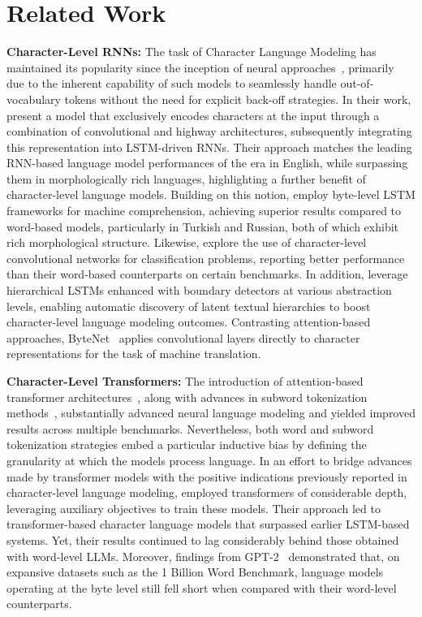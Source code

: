 \section{Related Work}
\label{section:related_work}

\textbf{Character-Level RNNs:} The task of Character Language Modeling has maintained its popularity since the inception of neural approaches~\citep{sutskever2011generating,mikolov2012subword,graves2013generating}, primarily due to the inherent capability of such models to seamlessly handle out-of-vocabulary tokens without the need for explicit back-off strategies. In their work, \cite{kim2016character} present a model that exclusively encodes characters at the input through a combination of convolutional and highway architectures, subsequently integrating this representation into LSTM-driven RNNs. Their approach matches the leading RNN-based language model performances of the era in English, while surpassing them in morphologically rich languages, highlighting a further benefit of character-level language models. Building on this notion, \cite{kenter2018byte} employ byte-level LSTM frameworks for machine comprehension, achieving superior results compared to word-based models, particularly in Turkish and Russian, both of which exhibit rich morphological structure. Likewise, \cite{zhang2015character} explore the use of character-level convolutional networks for classification problems, reporting better performance than their word-based counterparts on certain benchmarks. In addition, \citet{chung2019hierarchical} leverage hierarchical LSTMs enhanced with boundary detectors at various abstraction levels, enabling automatic discovery of latent textual hierarchies to boost character-level language modeling outcomes. Contrasting attention-based approaches, ByteNet~\cite{kalchbrenner2016neural} applies convolutional layers directly to character representations for the task of machine translation.

\textbf{Character-Level Transformers:} The introduction of attention-based transformer architectures~\citep{vaswani2017attention}, along with advances in subword tokenization methods~\citep{sennrich-etal-2016-neural}, substantially advanced neural language modeling and yielded improved results across multiple benchmarks. Nevertheless, both word and subword tokenization strategies embed a particular inductive bias by defining the granularity at which the models process language. In an effort to bridge advances made by transformer models with the positive indications previously reported in character-level language modeling, \citet{al2019character} employed transformers of considerable depth, leveraging auxiliary objectives to train these models. Their approach led to transformer-based character language models that surpassed earlier LSTM-based systems. Yet, their results continued to lag considerably behind those obtained with word-level LLMs. Moreover, findings from GPT-2~\citep{radfordgpt2} demonstrated that, on expansive datasets such as the 1 Billion Word Benchmark, language models operating at the byte level still fell short when compared with their word-level counterparts.

